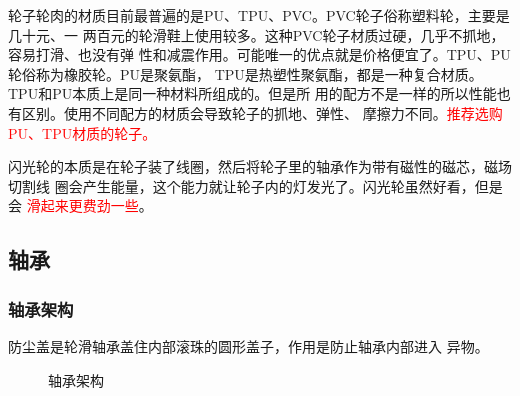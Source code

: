 \documentclass[12pt]{ctexart}
\begin{document}
轮子轮肉的材质目前最普遍的是PU、TPU、PVC。PVC轮子俗称塑料轮，主要是几十元、一
两百元的轮滑鞋上使用较多。这种PVC轮子材质过硬，几乎不抓地，容易打滑、也没有弹
性和减震作用。可能唯一的优点就是价格便宜了。TPU、PU轮俗称为橡胶轮。PU是聚氨酯，
TPU是热塑性聚氨酯，都是一种复合材质。TPU和PU本质上是同一种材料所组成的。但是所
用的配方不是一样的所以性能也有区别。使用不同配方的材质会导致轮子的抓地、弹性、
摩擦力不同。\textcolor{red}{推荐选购PU、TPU材质的轮子。}

闪光轮的本质是在轮子装了线圈，然后将轮子里的轴承作为带有磁性的磁芯，磁场切割线
圈会产生能量，这个能力就让轮子内的灯发光了。闪光轮虽然好看，但是会%
\textcolor{red}{滑起来更费劲一些}。

\subsection{轴承}
\subsubsection{轴承架构}
防尘盖是轮滑轴承盖住内部滚珠的圆形盖子，作用是防止轴承内部进入
异物。
\begin{figure}[tb]
\centering
{}
\caption{轴承架构\cite{zhihu:migao}}
\end{figure}
\end{document}
